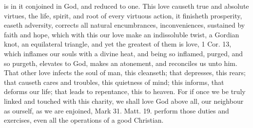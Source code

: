 {is in it conjoined in God, and reduced to one. This love causeth
true and absolute virtues, the life, spirit, and root of every virtuous
action, it finisheth prosperity, easeth adversity, corrects all natural
encumbrances, inconveniences, sustained by faith and hope, which with
this our love make an indissoluble twist, a Gordian knot, an
equilateral triangle, and yet the greatest of them is love, 1 Cor.
 13, which inflames our souls with a divine heat, and being
so inflamed, purged, and so purgeth, elevates to God, makes an
atonement, and reconciles us unto him.  That other love infects
the soul of man, this cleanseth; that depresses, this rears; that
causeth cares and troubles, this quietness of mind; this informs, that
deforms our life; that leads to repentance, this to heaven. For if once
we be truly linked and touched with this charity, we shall love God
above all, our neighbour as ourself, as we are enjoined, Mark  31.
Matt.  19. perform those duties and exercises, even all the
operations of a good Christian.

}
